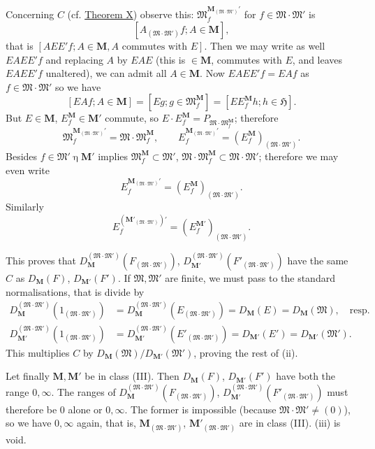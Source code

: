 \documentclass[12pt,b5paper,twoside]{article}
\newcommand{\Hspace}{\mathfrak H}
\newcommand{\M}{\mathbf M}
\newcommand{\thmref}[1]{\hyperref[thm:#1]{Theorem #1}}
\begin{document}
Concerning $C$ (cf. \thmref{X}) observe this:
$\mathfrak M_f^{\M_{(\mathfrak M\cdot\mathfrak M')}'}$ for
$f\in\mathfrak M\cdot\mathfrak M'$ is
\[
 [A_{(\mathfrak M\cdot\mathfrak M')}f;A\in\M],
\]
that is $[AEE'f;A\in\M, A\text{ commutes with }E]$. Then we may write as
well $EAEE'f$ and replacing $A$ by $EAE$ (this is $\in\M$, commutes with
$E$, and leaves $EAEE'f$ unaltered), we can admit all $A\in\M$. Now
$EAEE'f=EAf$ as $f\in\mathfrak M\cdot\mathfrak M'$ so we have
\[
 [EAf;A\in\M]=[Eg;g\in\mathfrak M_f^{\M}]
 =[EE_f^{\M}h;h\in\Hspace].
\]
But $E\in\M$, $E_f^{\M}\in\M'$ commute, so
$E\cdot E_f^{\M}=P_{\mathfrak M\cdot\mathfrak M_f^{\M}}$; therefore
\[
 \mathfrak M_f^{\M_{(\mathfrak M\cdot\mathfrak M')}'}
 =\mathfrak M\cdot\mathfrak M_f^{\M},
 \qquad
 E_f^{\M_{(\mathfrak M\cdot\mathfrak M')}'}
 =(E_f^{\M})_{(\mathfrak M\cdot\mathfrak M')}.
\]
Besides $f\in\mathfrak M'\mathbin\eta\M'$ implies
$\mathfrak M_f^{\M}\subset\mathfrak M'$,
$\mathfrak M\cdot\mathfrak M_f^{\M}\subset
\mathfrak M\cdot\mathfrak M'$; therefore we may even write
\[
 E_f^{\M_{(\mathfrak M\cdot\mathfrak M')}'}
 =(E_f^{\M})_{(\mathfrak M\cdot\mathfrak M')}.
\]
Similarly
\[
 E_f^{(\M'_{(\mathfrak M\cdot\mathfrak M')})'}
 =(E_f^{\M'})_{(\mathfrak M\cdot\mathfrak M')}.
\]

This proves that
$D_{\M}^{(\mathfrak M\cdot\mathfrak M')}
(F_{(\mathfrak M\cdot\mathfrak M')})$,
$D_{\M'}^{(\mathfrak M\cdot\mathfrak M')}
(F'_{(\mathfrak M\cdot\mathfrak M')})$ have the same $C$ as
$D_{\M}(F)$, $D_{\M'}(F')$. If $\mathfrak M,\mathfrak M'$ are finite, we
must pass to the standard normalisations, that is divide by
\begin{align*}
 D_{\M}^{(\mathfrak M\cdot\mathfrak M')}
 (1_{(\mathfrak M\cdot\mathfrak M')})
 &=D_{\M}^{(\mathfrak M\cdot\mathfrak M')}
 (E_{(\mathfrak M\cdot\mathfrak M')})
  =D_{\M}(E)=D_{\M}(\mathfrak M),\quad\text{resp.}\\
 D_{\M'}^{(\mathfrak M\cdot\mathfrak M')}
 (1_{(\mathfrak M\cdot\mathfrak M')})
 &=D_{\M'}^{(\mathfrak M\cdot\mathfrak M')}
 (E'_{(\mathfrak M\cdot\mathfrak M')})
 =D_{\M'}(E')=D_{\M'}(\mathfrak M').
\end{align*}
This multiplies $C$ by
$D_{\M}(\mathfrak M)/D_{\M'}(\mathfrak M')$, proving the rest of (ii).

Let finally $\M,\M'$ be in class (III). Then $D_{\M}(F)$,
$D_{\M'}(F')$ have both the range $0,\infty$. The ranges of
$D_{\M}^{(\mathfrak M\cdot\mathfrak M')}
(F_{(\mathfrak M\cdot\mathfrak M')})$,
$D_{\M'}^{(\mathfrak M\cdot\mathfrak M')}
(F'_{(\mathfrak M\cdot\mathfrak M')})$ must therefore be $0$ alone or
$0,\infty$. The former is impossible (because
$\mathfrak M\cdot\mathfrak M'\ne(0)$), so we have $0,\infty$ again, that
is, $\M_{(\mathfrak M\cdot\mathfrak M')}$,
$\M'_{(\mathfrak M\cdot\mathfrak M')}$ are in class (III). (iii) is
void.
\end{document}
